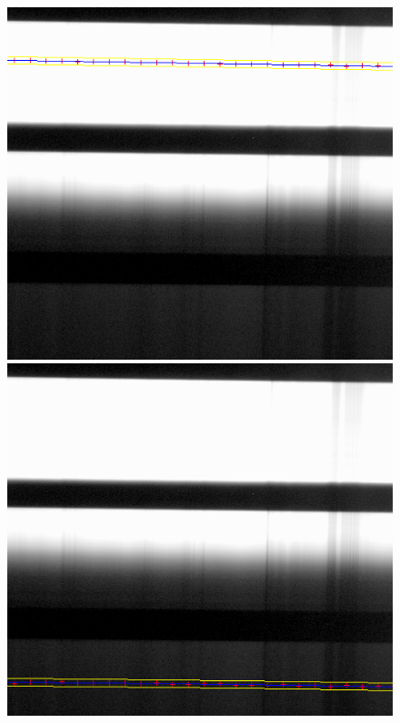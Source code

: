 \begin{figure}[htb]
\begin{center}
\includegraphics[scale=0.33]{plots/trace/moon.png}
\includegraphics[scale=0.33]{plots/trace/moonsky.png}

\end{center}
\end{figure}

